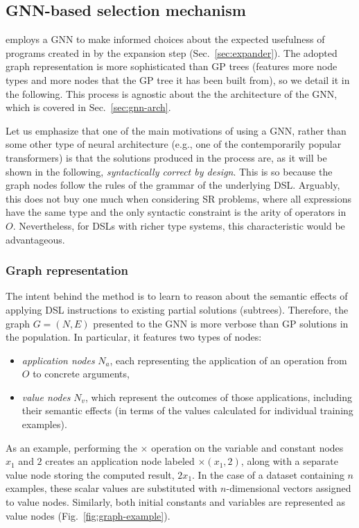 \subsection{GNN-based selection mechanism}\label{sec:gnn-sel}

\mname employs a GNN to make informed choices about the expected usefulness of programs created in by the expansion step (Sec.\ \ref{sec:expander}). The adopted graph representation is more sophisticated than GP trees (features more node types and more nodes that the GP tree it has been built from), so we detail it in the following. This process is agnostic about the the architecture of the GNN, which is covered in Sec.\ \ref{sec:gnn-arch}.

Let us emphasize that one of the main motivations of using a GNN, rather than some other type of neural architecture (e.g., one of the contemporarily popular transformers) is that the solutions produced in the process are, as it will be shown in the following, \emph{syntactically correct by design}. This is so because the graph nodes follow the rules of the grammar of the underlying DSL. Arguably, this does not buy one much when considering SR problems, where all expressions have the same type and the only syntactic constraint is the arity of operators in $O$. Nevertheless, for DSLs with richer type systems, this characteristic would be advantageous.


\subsubsection{Graph representation}

The intent behind the method is to learn to reason about the semantic effects of applying DSL instructions to existing partial solutions (subtrees). Therefore, the graph $G=(N,E)$ presented to the GNN is more verbose than GP solutions in the population. In particular, it features two types of nodes:
\begin{itemize}
    \item \emph{application nodes} $N_a$, each representing the application of an operation from $O$ to concrete arguments, 
    \item \emph{value nodes} $N_v$, which represent the outcomes of those applications, including their semantic effects (in terms of the values calculated for individual training examples). 
\end{itemize}
As an example, performing the $\times$ operation on the variable and constant nodes $x_1$ and $2$ creates an application node labeled $\times(x_1,2)$, along with a separate value node storing the computed result, $2x_1$. In the case of a dataset containing $n$ examples, these scalar values are substituted with $n$-dimensional vectors assigned to value nodes. Similarly, both initial constants and variables are represented as value nodes (Fig.~\ref{fig:graph-example}).



